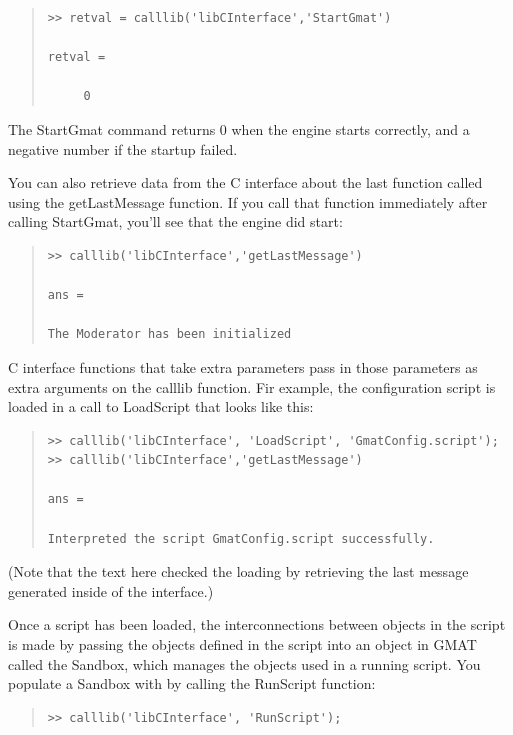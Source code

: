 \documentclass[letterpaper,10pt]{article}
\begin{document}
\begin{quote}
\begin{verbatim}
>> retval = calllib('libCInterface','StartGmat')

retval =

     0
\end{verbatim}
\end{quote}

\noindent The StartGmat command returns 0 when the engine starts correctly, and a negative number if the startup failed.  

You can also retrieve data from the C interface about the last function called using the getLastMessage function.  If you call that function immediately after calling StartGmat, you'll see that the engine did start:

\begin{quote}
\begin{verbatim}
>> calllib('libCInterface','getLastMessage')

ans =

The Moderator has been initialized
\end{verbatim}
\end{quote}

C interface functions that take extra parameters pass in those parameters as extra arguments on the calllib function.  Fir example, the configuration script is loaded in a call to LoadScript that looks like this:

\begin{quote}
\begin{verbatim}
>> calllib('libCInterface', 'LoadScript', 'GmatConfig.script');
>> calllib('libCInterface','getLastMessage')

ans =

Interpreted the script GmatConfig.script successfully.
\end{verbatim}
\end{quote}

\noindent (Note that the text here checked the loading by retrieving the last message generated inside of the interface.)

Once a script has been loaded, the interconnections between objects in the script is made by passing the objects defined in the script into an object in GMAT called the Sandbox, which manages the objects used in a running script.  You populate a Sandbox with by calling the RunScript function:

\begin{quote}
\begin{verbatim}
>> calllib('libCInterface', 'RunScript');
\end{verbatim}
\end{quote}
\end{document}
